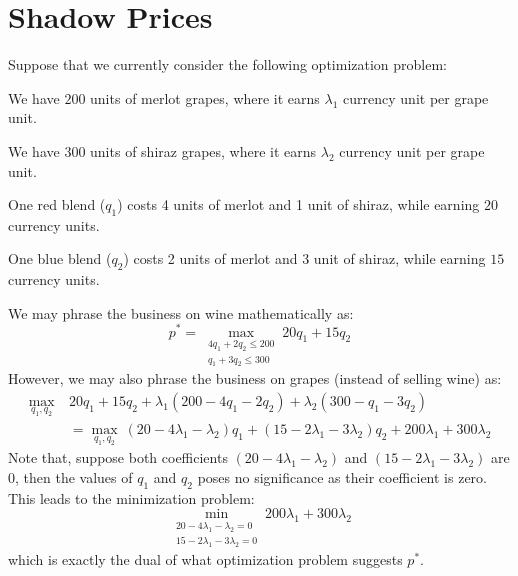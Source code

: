 \section{Shadow Prices}
Suppose that we currently consider the following optimization problem:
\begin{bindenum}
    \item We have $200$ units of merlot grapes, where it earns $\lambda_1$ currency unit per grape unit.
    \item We have $300$ units of shiraz grapes, where it earns $\lambda_2$ currency unit per grape unit.
    \item One red blend ($q_1$) costs 4 units of merlot and 1 unit of shiraz, while earning $20$ currency units.
    \item One blue blend ($q_2$) costs 2 units of merlot and 3 unit of shiraz, while earning $15$ currency units.
\end{bindenum}
We may phrase the business on wine mathematically as:
\[
    p^* = \max_{
        \substack{
            4q_1 + 2q_2 \leq 200 \\
            q_1 + 3q_2 \leq 300
        }
    } 20 q_1 + 15 q_2
\]
However, we may also phrase the business on grapes (instead of selling wine) as:
\begin{align*}
    \max_{q_1, q_2}\ &20q_1 + 15q_2 + \lambda_1 (200 - 4q_1 - 2q_2) + \lambda_2 (300 - q_1 - 3q_2) \\
    &= \max_{q_1, q_2}\ (20 - 4\lambda_1 - \lambda_2) q_1 + (15 - 2 \lambda_1 - 3 \lambda_2) q_2 + 200 \lambda_1 + 300 \lambda_2
\end{align*}
Note that, suppose both coefficients $(20 - 4\lambda_1 - \lambda_2)$ and $(15 - 2 \lambda_1 - 3 \lambda_2)$ are $0$, then the values of $q_1$ and $q_2$ poses no significance as their coefficient is zero. \\
This leads to the minimization problem:
\[
    \min_{
        \substack{
            20 - 4\lambda_1 - \lambda_2 = 0 \\
            15 - 2 \lambda_1 - 3 \lambda_2 = 0
        }
    } 200 \lambda_1 + 300 \lambda_2
\]
which is exactly the dual of what optimization problem suggests $p^*$.
